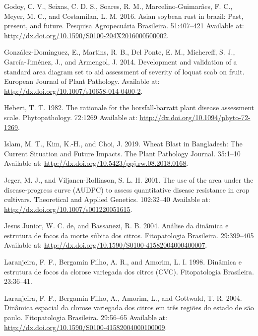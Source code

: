 \documentclass[
  letterpaper,
]{book}
\newlength{\cslhangindent}
\newlength{\cslentryspacingunit} %
\newenvironment{CSLReferences}[2] %
 {%
  \setlength{\parindent}{0pt}
  \ifodd #1
  \let\oldpar\par
  \def\par{\hangindent=\cslhangindent\oldpar}
  \fi
  \setlength{\parskip}{#2\cslentryspacingunit}
 }%
 {}
\begin{document}
\begin{CSLReferences}{0}{0}
\leavevmode{}%
Godoy, C. V., Seixas, C. D. S., Soares, R. M., Marcelino-Guimarães, F.
C., Meyer, M. C., and Costamilan, L. M. 2016. Asian soybean rust in
brazil: Past, present, and future. Pesquisa Agropecuária Brasileira.
51:407--421 Available at:
\url{http://dx.doi.org/10.1590/S0100-204X2016000500002}.

\leavevmode{}%
González-Domínguez, E., Martins, R. B., Del Ponte, E. M., Michereff, S.
J., García-Jiménez, J., and Armengol, J. 2014. Development and
validation of a standard area diagram set to aid assessment of severity
of loquat scab on fruit. European Journal of Plant Pathology. Available
at: \url{http://dx.doi.org/10.1007/s10658-014-0400-2}.

\leavevmode{}%
Hebert, T. T. 1982. The rationale for the horsfall-barratt plant disease
assessment scale. Phytopathology. 72:1269 Available at:
\url{http://dx.doi.org/10.1094/phyto-72-1269}.

\leavevmode{}%
Islam, M. T., Kim, K.-H., and Choi, J. 2019. Wheat Blast in Bangladesh:
The Current Situation and Future Impacts. The Plant Pathology Journal.
35:1--10 Available at:
\url{http://dx.doi.org/10.5423/ppj.rw.08.2018.0168}.

\leavevmode{}%
Jeger, M. J., and Viljanen-Rollinson, S. L. H. 2001. The use of the area
under the disease-progress curve (AUDPC) to assess quantitative disease
resistance in crop cultivars. Theoretical and Applied Genetics.
102:32--40 Available at: \url{http://dx.doi.org/10.1007/s001220051615}.

\leavevmode{}%
Jesus Junior, W. C. de, and Bassanezi, R. B. 2004. Análise da dinâmica e
estrutura de focos da morte súbita dos citros. Fitopatologia Brasileira.
29:399--405 Available at:
\url{http://dx.doi.org/10.1590/S0100-41582004000400007}.

\leavevmode{}%
Laranjeira, F. F., Bergamin Filho, A. R., and Amorim, L. I. 1998.
Din{â}mica e estrutura de focos da clorose variegada dos citros (CVC).
Fitopatologia Brasileira. 23:36--41.

\leavevmode{}%
Laranjeira, F. F., Bergamin Filho, A., Amorim, L., and Gottwald, T. R.
2004. Dinâmica espacial da clorose variegada dos citros em três regiões
do estado de são paulo. Fitopatologia Brasileira. 29:56--65 Available
at: \url{http://dx.doi.org/10.1590/S0100-41582004000100009}.


\end{CSLReferences}
\end{document}
